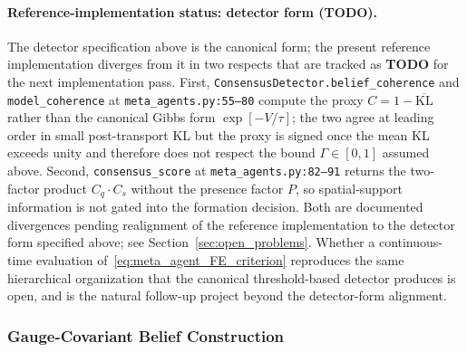 \documentclass[11pt]{article}
\begin{document}
\paragraph{Reference-implementation status: detector form (\textbf{TODO}).}
The detector specification above is the canonical form; the present reference implementation diverges from it in two respects that are tracked as \textbf{TODO} for the next implementation pass. First, \texttt{ConsensusDetector.belief\_coherence} and \texttt{model\_coherence} at \texttt{meta\_agents.py:55--80} compute the proxy $C = 1 - \overline{\mathrm{KL}}$ rather than the canonical Gibbs form $\exp[-V/\tau]$; the two agree at leading order in small post-transport KL but the proxy is signed once the mean KL exceeds unity and therefore does not respect the bound $\Gamma \in [0, 1]$ assumed above. Second, \texttt{consensus\_score} at \texttt{meta\_agents.py:82--91} returns the two-factor product $C_q \cdot C_s$ without the presence factor $P$, so spatial-support information is not gated into the formation decision. Both are documented divergences pending realignment of the reference implementation to the detector form specified above; see Section~\ref{sec:open_problems}. Whether a continuous-time evaluation of~\eqref{eq:meta_agent_FE_criterion} reproduces the same hierarchical organization that the canonical threshold-based detector produces is open, and is the natural follow-up project beyond the detector-form alignment.

\subsubsection{Gauge-Covariant Belief Construction}
\label{sec:meta_agent_state_construction}
\end{document}
